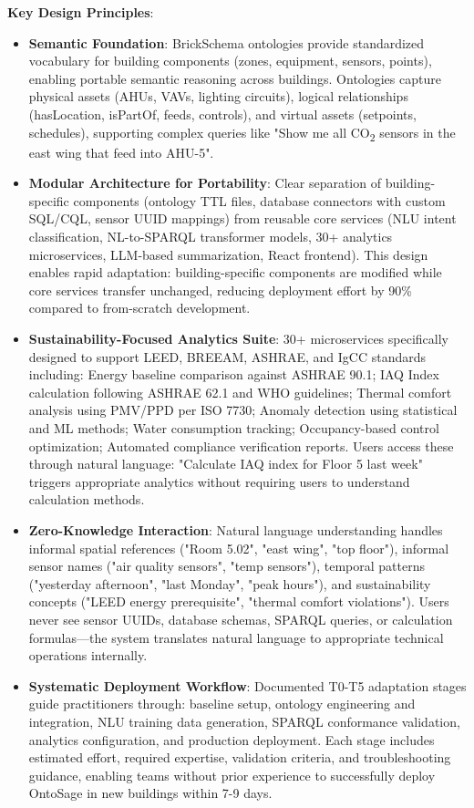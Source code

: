 \documentclass[acmlarge]{acmart}
\begin{document}
\textbf{Key Design Principles}:

\begin{itemize}
    \item \textbf{Semantic Foundation}: BrickSchema ontologies provide standardized vocabulary for building components (zones, equipment, sensors, points), enabling portable semantic reasoning across buildings. Ontologies capture physical assets (AHUs, VAVs, lighting circuits), logical relationships (hasLocation, isPartOf, feeds, controls), and virtual assets (setpoints, schedules), supporting complex queries like "Show me all CO\textsubscript{2} sensors in the east wing that feed into AHU-5".
    
    \item \textbf{Modular Architecture for Portability}: Clear separation of building-specific components (ontology TTL files, database connectors with custom SQL/CQL, sensor UUID mappings) from reusable core services (NLU intent classification, NL-to-SPARQL transformer models, 30+ analytics microservices, LLM-based summarization, React frontend). This design enables rapid adaptation: building-specific components are modified while core services transfer unchanged, reducing deployment effort by 90\% compared to from-scratch development.
    
    \item \textbf{Sustainability-Focused Analytics Suite}: 30+ microservices specifically designed to support LEED, BREEAM, ASHRAE, and IgCC standards including: Energy baseline comparison against ASHRAE 90.1; IAQ Index calculation following ASHRAE 62.1 and WHO guidelines; Thermal comfort analysis using PMV/PPD per ISO 7730; Anomaly detection using statistical and ML methods; Water consumption tracking; Occupancy-based control optimization; Automated compliance verification reports. Users access these through natural language: "Calculate IAQ index for Floor 5 last week" triggers appropriate analytics without requiring users to understand calculation methods.
    
    \item \textbf{Zero-Knowledge Interaction}: Natural language understanding handles informal spatial references ("Room 5.02", "east wing", "top floor"), informal sensor names ("air quality sensors", "temp sensors"), temporal patterns ("yesterday afternoon", "last Monday", "peak hours"), and sustainability concepts ("LEED energy prerequisite", "thermal comfort violations"). Users never see sensor UUIDs, database schemas, SPARQL queries, or calculation formulas—the system translates natural language to appropriate technical operations internally.
    
    \item \textbf{Systematic Deployment Workflow}: Documented T0-T5 adaptation stages guide practitioners through: baseline setup, ontology engineering and integration, NLU training data generation, SPARQL conformance validation, analytics configuration, and production deployment. Each stage includes estimated effort, required expertise, validation criteria, and troubleshooting guidance, enabling teams without prior experience to successfully deploy OntoSage in new buildings within 7-9 days.
\end{itemize}
\end{document}
